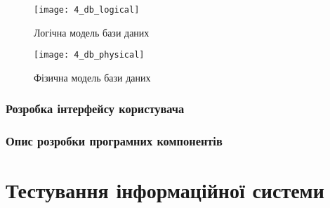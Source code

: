\documentclass[../main.tex]{subfiles}
\begin{document}
\begin{figure}[H]
	\centering
	\texttt{[image: 4\_db\_logical]}
	\caption{Логічна модель бази даних}
\end{figure}

\begin{figure}[H]
	\centering
	\texttt{[image: 4\_db\_physical]}
	\caption{Фізична модель бази даних}
\end{figure}

\subsection{Розробка інтерфейсу користувача}


\subsection{Опис розробки програмних компонентів}


\chapter{Тестування інформаційної системи}

\end{document}
